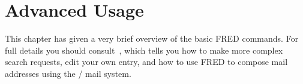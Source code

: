 \section {Advanced Usage}

This chapter has given a very brief overview of the basic FRED commands.
For full details you should consult~\cite{PSI.Fred}, which tells you how
to make more complex search requests, edit your own entry, and how to use
FRED to compose mail addresses using the \MH/ mail system.
